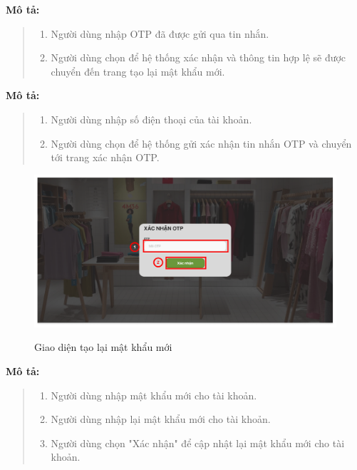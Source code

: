     \textbf{Mô tả:}
    \begin{quote}
        \begin{enumerate}
            \item Người dùng nhập OTP đã được gửi qua tin nhắn.
            \item Người dùng chọn để hệ thống xác nhận và thông tin hợp lệ sẽ được chuyển đến trang tạo lại mật khẩu mới.
        \end{enumerate}
    \end{quote}
    \textbf{Mô tả:}
    \begin{quote}
        \begin{enumerate}
            \item Người dùng nhập số điện thoại của tài khoản.
            \item Người dùng chọn để hệ thống gửi xác nhận tin nhắn OTP và chuyển tới trang xác nhận OTP.
        \end{enumerate}
    \end{quote}
    \begin{figure}[!htp]
        \centering
        \includegraphics[width=5in]{img/UI/customer/confirm_otp.png}
        \label{5}
        \newline
        \caption{Giao diện tạo lại mật khẩu mới}
    \end{figure}
    \textbf{Mô tả:}
    \begin{quote}
        \begin{enumerate}
            \item Người dùng nhập mật khẩu mới cho tài khoản.
            \item Người dùng nhập lại mật khẩu mới cho tài khoản.
            \item Người dùng chọn "Xác nhận" để cập nhật lại mật khẩu mới cho tài khoản.
        \end{enumerate}
    \end{quote}
    
